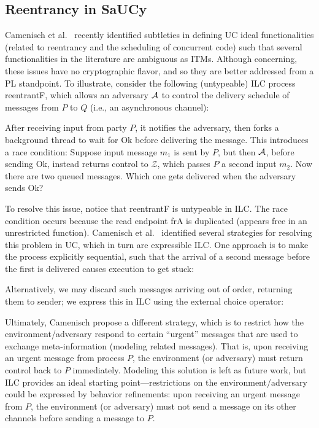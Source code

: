 \subsection{Reentrancy in SaUCy}
\label{subsec:reentrancy}

Camenisch et al.~\cite{camenisch2016universal} recently identified subtleties in
defining UC ideal functionalities (related to reentrancy and the scheduling of
concurrent code) such that several functionalities in the literature are
ambiguous as ITMs. Although concerning, these issues have no cryptographic
flavor, and so they are better addressed from a PL standpoint.  To illustrate,
consider the following (untypeable) ILC process \textsf{reentrantF}, which
allows an adversary $\mathcal{{A}}$ to control the delivery schedule of messages from
$P$ to $Q$ (i.e., an asynchronous channel):



After receiving input from party $P$, it notifies the adversary, then forks a
background thread to wait for \textsf{Ok} before delivering the message.  This
introduces a race condition: Suppose input message $m_1$ is sent by $P$, but
then $\mathcal{{A}}$, before sending \textsf{Ok}, instead returns control to $\mathcal
Z$, which passes $P$ a second input $m_2$. Now there are two queued
messages. Which one gets delivered when the adversary sends \textsf{Ok}?

To resolve this issue, notice that \textsf{reentrantF} is untypeable in ILC.
The race condition occurs because the read endpoint \textsf{frA} is duplicated
(appears free in an unrestricted function).  Camenisch et
al.~\cite{camenisch2016universal} identified several strategies for resolving
this problem in UC, which in turn are expressible ILC. One approach is to make
the process explicitly sequential, such that the arrival of a second message
before the first is delivered causes execution to get stuck:

Alternatively, we may discard such messages arriving out of order, returning
them to sender; we express this in ILC using the external choice operator:


Ultimately, Camenisch \etal propose a different strategy, which is to restrict
how the environment/adversary respond to certain ``urgent'' messages that are
used to exchange meta-information (modeling related messages). That is, upon
receiving an urgent message from process $P$, the environment (or adversary)
must return control back to $P$ immediately. Modeling this solution is left as
future work, but ILC provides an ideal starting point---restrictions on the
environment/adversary could be expressed by behavior refinements: upon receiving
an urgent message from $P$, the environment (or adversary) must not send a
message on its other channels before sending a message to $P$.
